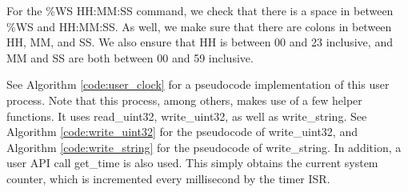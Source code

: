 \documentclass[12pt]{report}
\begin{document}
    For the \%WS HH:MM:SS command, we check that there is a space in between
    \%WS and HH:MM:SS.  As well, we make sure that there are colons in between
    HH, MM, and SS.  We also ensure that HH is between 00 and 23 inclusive, and
    MM and SS are both between 00 and 59 inclusive.

    See Algorithm \ref{code:user_clock} for a pseudocode implementation
    of this user process.  Note that this process, among others, makes use of
    a few helper functions.  It uses read\_uint32, write\_uint32, as well as
    write\_string.  See Algorithm \ref{code:write_uint32} for the pseudocode of
    write\_uint32, and Algorithm \ref{code:write_string} for the pseudocode of
    write\_string.  In addition, a user API call get\_time is also used.  This
    simply obtains the current system counter, which is incremented every
    millisecond by the timer ISR.
\end{document}
